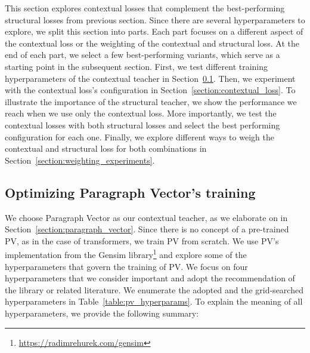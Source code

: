 This section explores contextual losses that complement the best-performing
structural losses from previous section. Since there are several
hyperparameters to explore, we split this section into parts. Each part focuses
on a different aspect of the contextual loss or the weighting of the contextual
and structural loss. At the end of each part, we select a few best-performing
variants, which serve as a starting point in the subsequent section. First, we
test different training hyperparameters of the contextual teacher in
Section~\ref{section:pv_training}. Then, we experiment with the contextual
loss's configuration in Section~\ref{section:contextual_loss}. To illustrate
the importance of the structural teacher, we show the performance we reach when
we use only the contextual loss. More importantly, we test the contextual
losses with both structural losses and select the best performing configuration
for each one. Finally, we explore different ways to weigh the contextual and
structural loss for both combinations in
Section~\ref{section:weighting_experiments}.

\subsection{Optimizing Paragraph Vector's training}\label{section:pv_training}

We choose Paragraph Vector \citep{le2014distributed} as our contextual teacher,
as we elaborate on in Section~\ref{section:paragraph_vector}. Since there is no
concept of a pre-trained PV, as in the case of transformers, we train PV from
scratch. We use PV's implementation from the Gensim
library\footnote{\label{fn:link_to_gensim}\url{https://radimrehurek.com/gensim}}
and explore some of the hyperparameters that govern the training of PV. We
focus on four hyperparameters that we consider important and adopt the
recommendation of the library or related literature. We enumerate the adopted
and the grid-searched hyperparameters in Table~\ref{table:pv_hyperparams}. To
explain the meaning of all hyperparameters, we provide the following summary:


